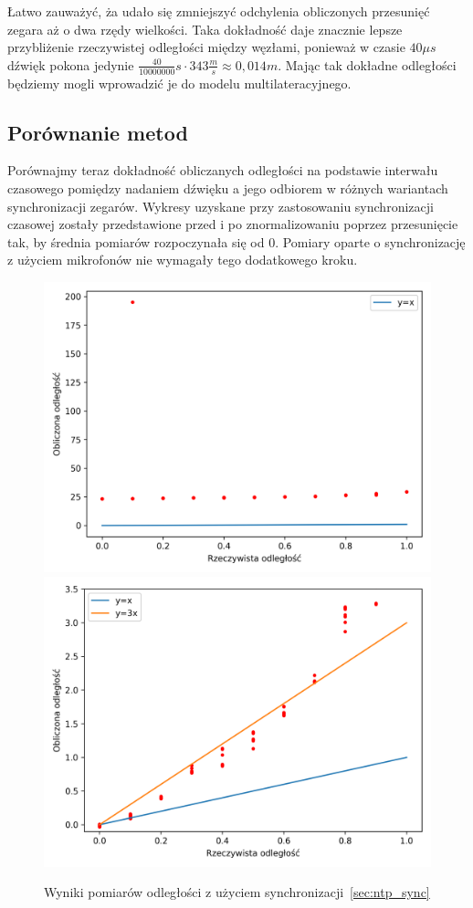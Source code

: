 Łatwo zauważyć, ża udało się zmniejszyć odchylenia obliczonych przesunięć zegara aż o dwa rzędy wielkości. Taka dokładność daje znacznie lepsze przybliżenie rzeczywistej odległości między węzłami, ponieważ w czasie $40 \mu s$ dźwięk pokona jedynie $\frac{40}{10000000}s \cdot 343 \frac{m}{s} \approx 0,014m$. Mając tak dokładne odległości będziemy mogli wprowadzić je do modelu multilateracyjnego.

\subsection{Porównanie metod}

Porównajmy teraz dokładność obliczanych odległości na podstawie interwału czasowego pomiędzy nadaniem dźwięku a jego odbiorem w różnych wariantach synchronizacji zegarów. Wykresy uzyskane przy zastosowaniu synchronizacji czasowej zostały przedstawione przed i po znormalizowaniu poprzez przesunięcie tak, by średnia pomiarów rozpoczynała się od 0. Pomiary oparte o synchronizację z użyciem mikrofonów nie wymagały tego dodatkowego kroku.

\begin{figure}[H]
\centering
    \includegraphics[width=.49\textwidth]{pics/ntp_sync_dist/dists.png}
    \includegraphics[width=.49\textwidth]{pics/ntp_sync_dist/dists_close.png}
\caption{Wyniki pomiarów odległości z użyciem synchronizacji~\ref{sec:ntp_sync}}
\label{pic:ntp_sync_dist}
\end{figure}


